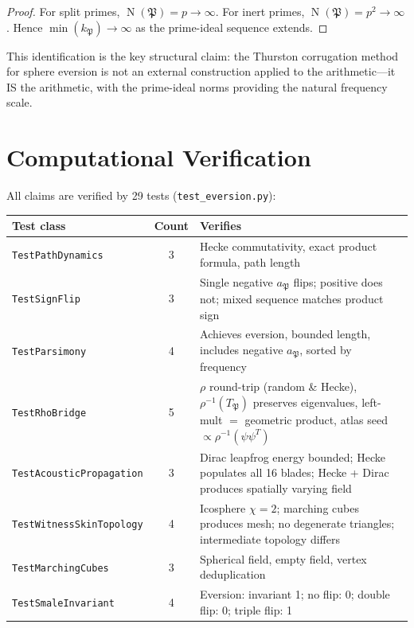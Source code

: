 \documentclass[11pt,a4paper]{article}
\theoremstyle{plain}
\theoremstyle{definition}
\theoremstyle{remark}
\numberwithin{equation}{section}
\providecommand{\fP}{\mathfrak{P}}
\DeclareMathOperator{\Nm}{N}
\begin{document}
\begin{proof}
For split primes, $\Nm(\fP) = p \to \infty$.  For inert primes,
$\Nm(\fP) = p^2 \to \infty$.  Hence $\min(k_\fP) \to \infty$ as the
prime-ideal sequence extends.
\end{proof}

This identification is the key structural claim: the Thurston
corrugation method for sphere eversion is not an external construction
applied to the arithmetic---it IS the arithmetic, with the prime-ideal
norms providing the natural frequency scale.


\section{Computational Verification}\label{sec:verification}

All claims are verified by 29 tests (\texttt{test\_eversion.py}):

\begin{center}
\begin{tabular}{lcp{7cm}}
\toprule
Test class & Count & Verifies \\
\midrule
\texttt{TestPathDynamics}     & 3 & Hecke commutativity, exact product formula, path length \\
\texttt{TestSignFlip}         & 3 & Single negative $a_\fP$ flips; positive does not; mixed sequence matches product sign \\
\texttt{TestParsimony}        & 4 & Achieves eversion, bounded length, includes negative $a_\fP$, sorted by frequency \\
\texttt{TestRhoBridge}        & 5 & $\rho$ round-trip (random \& Hecke), $\rho^{-1}(T_\fP)$ preserves eigenvalues, left-mult $=$ geometric product, atlas seed $\propto\rho^{-1}(\psi\psi^T)$ \\
\texttt{TestAcousticPropagation} & 3 & Dirac leapfrog energy bounded; Hecke populates all 16 blades; Hecke + Dirac produces spatially varying field \\
\texttt{TestWitnessSkinTopology}  & 4 & Icosphere $\chi = 2$; marching cubes produces mesh; no degenerate triangles; intermediate topology differs \\
\texttt{TestMarchingCubes}    & 3 & Spherical field, empty field, vertex deduplication \\
\texttt{TestSmaleInvariant}   & 4 & Eversion: invariant 1; no flip: 0; double flip: 0; triple flip: 1 \\
\bottomrule
\end{tabular}
\end{center}
\end{document}
